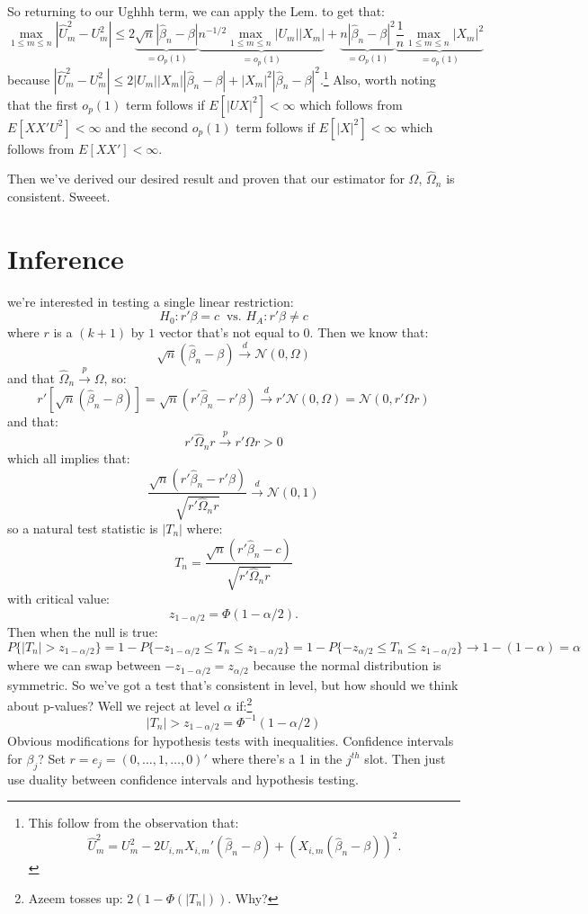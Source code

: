 \documentclass{tufte-book}
\theoremstyle{mytheoremstyle}
\theoremstyle{mylemstyle}
\theoremstyle{mydefstyle}
\begin{document}
\noindent So returning to our Ughhh term, we can apply the Lem. to get that:
	\[\max_{1 \le m \le n} |\hat{U}_m^2 - U^2_m| \le 2 \underbrace{\sqrt{n} |\hat{\beta}_n - \beta|}_\textrm{\(=O_p(1)\)} \underbrace{n^{-1/2} \max_{1 \le m \le n} |U_m||X_m|}_\textrm{\(=o_p(1)\)} + \underbrace{n|\hat{\beta}_n - \beta|^2}_\textrm{\(=O_p(1)\)} \underbrace{\frac{1}{n}\max_{1\le m \le n}|X_m|^2}_\textrm{\(=o_p(1)\)}\]
because \(|\hat{U}_m^2 - U^2_m| \le 2 |U_m||X_m||\hat{\beta}_n - \beta| + |X_m|^2|\hat{\beta}_n - \beta|^2\).\footnote{This follow from the observation that:
	\[\hat{U}^2_m = U^2_m - 2U_{i,m}X_{i,m}'(\hat{\beta}_n - \beta) + (X_{i,m}(\hat{\beta}_n - \beta))^2\text{.}\]}
Also, worth noting that the first \(o_p(1)\) term follows if \(E[|UX|^2] < \infty\) which follows from \(E[XX'U^2] < \infty\) and the second \(o_p(1)\) term follows if \(E[|X|^2] < \infty\) which follows from \(E[XX'] < \infty\). 

Then we've derived our desired result and proven that our estimator for \(\Omega\), \(\hat{\Omega}_n\) is consistent. Sweeet. 

\section{Inference}
 we're interested in testing a single linear restriction:
	\[H_0: r'\beta = c\ \text{ vs. } H_A: r'\beta \ne c\]
where \(r\) is a \((k+1)\) by \(1\) vector that's not equal to 0. Then we know that:
	\[\sqrt{n}(\hat{\beta}_n - \beta) \overset{d}{\rightarrow} \mathcal{N}(0, \Omega)\]
and that \(\hat{\Omega}_n \overset{p}{\rightarrow} \Omega\), so:
	\[r'[\sqrt{n}(\hat{\beta}_n - \beta)] = \sqrt{n}(r'\hat{\beta}_n - r'\beta) \overset{d}{\rightarrow} r'\mathcal{N}(0, \Omega) = \mathcal{N}(0, r'\Omega r)\]
and that:
	\[r'\hat{\Omega}_n r \overset{p}{\rightarrow} r'\Omega r > 0\]
which all implies that:
	\[\frac{\sqrt{n}(r'\hat{\beta}_n - r'\beta)}{\sqrt{r'\hat{\Omega}_n r}} \overset{d}{\rightarrow} \mathcal{N}(0,1)\]
so a natural test statistic is \(|T_n|\) where:
	\[T_n = \frac{\sqrt{n}(r'\hat{\beta}_n - c)}{\sqrt{r'\hat{\Omega}_n r}}\]
with critical value:
	\[z_{1-\alpha/2} = \Phi(1-\alpha/2) \text{.}\]
Then when the null is true:
	\[P\{|T_n| > z_{1-\alpha/2}\} = 1 - P\{-z_{1-\alpha/2} \le T_n \le z_{1-\alpha/2}\} = 1-  P\{-z_{\alpha/2} \le T_n \le z_{1-\alpha/2}\} \rightarrow 1-(1-\alpha) = \alpha\]
where we can swap between \(-z_{1-\alpha/2} = z_{\alpha/2}\) because the normal distribution is symmetric. So we've got a test that's consistent in level, but how should we think about p-values? Well we reject at level \(\alpha\) if:\footnote{Azeem tosses up: \(2(1-\Phi(|T_n|))\). Why?}
	\[|T_n| > z_{1-\alpha/2} = \Phi^{-1}(1-\alpha/2)\]
Obvious modifications for hypothesis tests with inequalities. Confidence intervals for \(\beta_j\)? Set \(r = e_j = (0, \dots, 1, \dots, 0)'\) where there's a 1 in the \(j^{th}\) slot. Then just use duality between confidence intervals and hypothesis testing.
	
\end{document}
